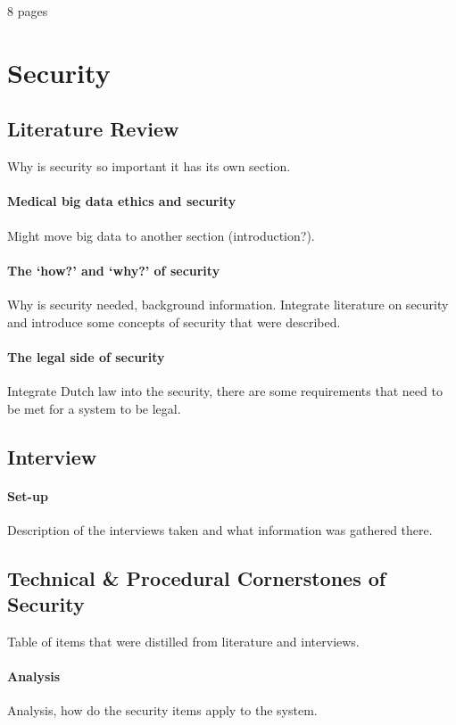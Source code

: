 \newline

8 pages

\section{Security}

\subsection{Literature Review}
Why is security so important it has its own section.
\paragraph{Medical big data ethics and security}
Might move big data to another section (introduction?).
\paragraph{The `how?' and `why?' of security}
Why is security needed, background information.	
Integrate literature on security and introduce some concepts of security that were described.
\paragraph{The legal side of security}
Integrate Dutch law into the security, there are some requirements that need to be met for a system to be legal.

\subsection{Interview}
\paragraph{Set-up}
Description of the interviews taken and what information was gathered there.

\subsection{Technical \& Procedural Cornerstones of Security}
Table of items that were distilled from literature and interviews.
\paragraph{Analysis}
Analysis, how do the security items apply to the system.